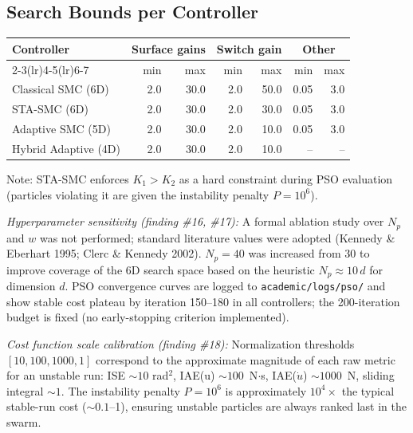 \documentclass[11pt, a4paper]{article}
\begin{document}
\subsection{Search Bounds per Controller}

\begin{center}
\begin{tabular}{@{}lrrrrrr@{}}
\toprule
\textbf{Controller} &
  \multicolumn{2}{c}{\textbf{Surface gains}} &
  \multicolumn{2}{c}{\textbf{Switch gain}} &
  \multicolumn{2}{c}{\textbf{Other}} \\
\cmidrule(lr){2-3}\cmidrule(lr){4-5}\cmidrule(lr){6-7}
& min & max & min & max & min & max \\
\midrule
Classical SMC (6D)      & 2.0  & 30.0  & 2.0  & 50.0  & 0.05 & 3.0  \\
STA-SMC (6D)            & 2.0  & 30.0  & 2.0  & 30.0  & 0.05 & 3.0  \\
Adaptive SMC (5D)       & 2.0  & 30.0  & 2.0  & 10.0  & 0.05 & 3.0  \\
Hybrid Adaptive (4D)    & 2.0  & 30.0  & 2.0  & 10.0  & --   & --   \\
\bottomrule
\end{tabular}
\end{center}

Note: STA-SMC enforces $K_1 > K_2$ as a hard constraint during PSO evaluation
(particles violating it are given the instability penalty $P = 10^6$).

\textit{Hyperparameter sensitivity (finding \#16, \#17):}
A formal ablation study over $N_p$ and $w$ was not performed; standard literature
values were adopted (Kennedy \& Eberhart 1995; Clerc \& Kennedy 2002).
$N_p = 40$ was increased from 30 to improve coverage of the 6D search space
based on the heuristic $N_p \approx 10\,d$ for dimension $d$.
PSO convergence curves are logged to \texttt{academic/logs/pso/} and show
stable cost plateau by iteration 150--180 in all controllers; the
200-iteration budget is fixed (no early-stopping criterion implemented).

\textit{Cost function scale calibration (finding \#18):}
Normalization thresholds $[10, 100, 1000, 1]$ correspond to the approximate
magnitude of each raw metric for an unstable run:
ISE $\sim 10$ rad$^2$, IAE(u) $\sim 100$~N$\cdot$s, IAE($\dot{u}$) $\sim 1000$~N,
sliding integral $\sim 1$.
The instability penalty $P = 10^6$ is approximately $10^4\times$ the typical
stable-run cost ($\sim 0.1$--1), ensuring unstable particles are always ranked
last in the swarm.
\end{document}
